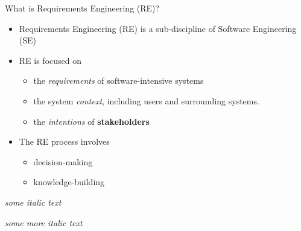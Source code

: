 
\begin{Slide}{What is Requirements Engineering (RE)?}

\begin{itemize}
\item Requirements Engineering (RE) is a sub-discipline of Software Engineering (SE) 

\item RE is focused on 

\begin{itemize}
\item the \textit{requirements} of software-intensive systems 
\item the system \textit{context}, including users and surrounding systems.
\item the \textit{intentions} of \textbf{stakeholders}

\end{itemize}
\item The RE process involves 
\begin{itemize}
\item decision-making
\item knowledge-building

\end{itemize}
\end{itemize}
\textit{some italic text}


\textit{some more italic text}


\end{Slide}
